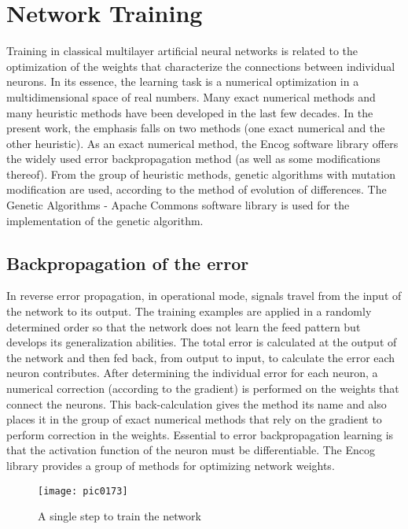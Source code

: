 \newpage
\chapter{Network Training}
\label{chapter07}

Training in classical multilayer artificial neural networks is related to the optimization of the weights that characterize the connections between individual neurons. In its essence, the learning task is a numerical optimization in a multidimensional space of real numbers. Many exact numerical methods and many heuristic methods have been developed in the last few decades. In the present work, the emphasis falls on two methods (one exact numerical and the other heuristic). As an exact numerical method, the Encog software library offers the widely used error backpropagation method (as well as some modifications thereof). From the group of heuristic methods, genetic algorithms with mutation modification are used, according to the method of evolution of differences. The Genetic Algorithms - Apache Commons software library is used for the implementation of the genetic algorithm.

\section{Backpropagation of the error}

In reverse error propagation, in operational mode, signals travel from the input of the network to its output. The training examples are applied in a randomly determined order so that the network does not learn the feed pattern but develops its generalization abilities. The total error is calculated at the output of the network and then fed back, from output to input, to calculate the error each neuron contributes. After determining the individual error for each neuron, a numerical correction (according to the gradient) is performed on the weights that connect the neurons. This back-calculation gives the method its name and also places it in the group of exact numerical methods that rely on the gradient to perform correction in the weights. Essential to error backpropagation learning is that the activation function of the neuron must be differentiable. The Encog library provides a group of methods for optimizing network weights.

\begin{figure}[h]
\centering
\texttt{[image: pic0173]}
\caption{A single step to train the network}
\label{fig:pic0173}
\end{figure}
\FloatBarrier

